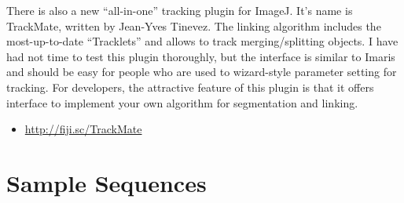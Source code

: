 \documentclass[11pnt]{article}
\begin{document}
There is also a new ``all-in-one'' tracking plugin for ImageJ. It's name is TrackMate, written by Jean-Yves Tinevez. The linking algorithm includes the most-up-to-date ``Tracklets'' and allows to track merging/splitting objects. I have had not time to test this plugin thoroughly, but the interface is similar to Imaris and should be easy for people who are used to wizard-style parameter setting for tracking. For developers, the attractive feature of this plugin is that it offers interface to implement your own algorithm for segmentation and linking. 

\begin{itemize}
\item \url{http://fiji.sc/TrackMate}
\end{itemize}

\section{Sample Sequences}
\end{document}
